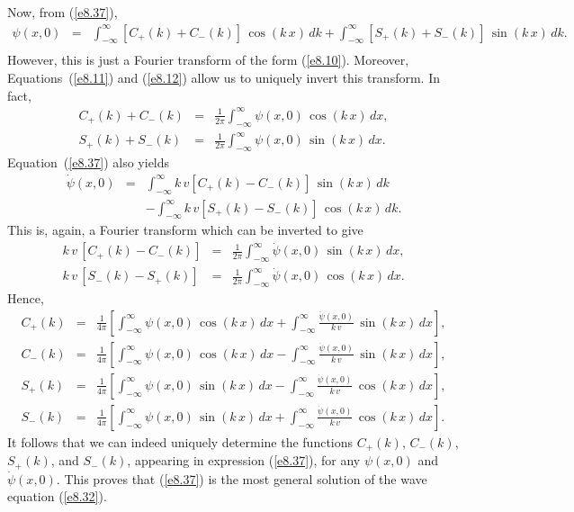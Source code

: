 Now, from (\ref{e8.37}),
\begin{eqnarray}
\psi(x,0) &=& \int_{-\infty}^{\infty}\left[C_+(k)+C_-(k)\right]\,\cos(k\,x)\,dk+  \int_{-\infty}^{\infty}\left[S_+(k)+S_-(k)\right]\,\sin(k\,x)\,dk.\nonumber\\[0.5ex]&&
\end{eqnarray}
However, this is just a Fourier transform of the form (\ref{e8.10}). Moreover,
Equations~(\ref{e8.11}) and (\ref{e8.12}) allow us to uniquely invert this
transform. In fact,
\begin{eqnarray}
C_+(k) + C_-(k) &=& \frac{1}{2\pi}\int_{-\infty}^{\infty} \psi(x,0)\,\cos(k\,x)\,dx,\\[0.5ex]
S_+(k) + S_-(k) &=&  \frac{1}{2\pi}\int_{-\infty}^{\infty} \psi(x,0)\,\sin(k\,x)\,dx.
\end{eqnarray}
Equation~(\ref{e8.37}) also yields
\begin{eqnarray}
\dot{\psi}(x,0) &=& \int_{-\infty}^{\infty}k\,v\left[C_+(k)-C_-(k)\right]\,\sin(k\,x)\,dk\nonumber\\[0.5ex]
&&- \int_{-\infty}^{\infty}k\,v\left[S_+(k)-S_-(k)\right]\,\cos(k\,x)\,dk.
\end{eqnarray}
This is, again, a Fourier transform which can be inverted to give
\begin{eqnarray}
k\,v\,[C_+(k) - C_-(k)]&=& \frac{1}{2\pi}\int_{-\infty}^{\infty} \dot{\psi}(x,0)\,\sin(k\,x)\,dx,\\[0.5ex]
k\,v\,[S_-(k) - S_+(k)] &=&  \frac{1}{2\pi}\int_{-\infty}^{\infty} \dot{\psi}(x,0)\,\cos(k\,x)\,dx.
\end{eqnarray}
Hence,
\begin{eqnarray}
C_+(k)&=&\frac{1}{4\pi}\left[\int_{-\infty}^{\infty}\psi(x,0)\,\cos(k\,x)\,dx
+ \int_{-\infty}^\infty \frac{\dot{\psi}(x,0)}{k\,v}\,\sin(k\,x)\,dx\right],\\[0.5ex]
C_-(k)&=&\frac{1}{4\pi}\left[\int_{-\infty}^{\infty}\psi(x,0)\,\cos(k\,x)\,dx
- \int_{-\infty}^\infty \frac{\dot{\psi}(x,0)}{k\,v}\,\sin(k\,x)\,dx\right],\\[0.5ex]
S_+(k)&=&\frac{1}{4\pi}\left[\int_{-\infty}^{\infty}\psi(x,0)\,\sin(k\,x)\,dx
- \int_{-\infty}^\infty \frac{\dot{\psi}(x,0)}{k\,v}\,\cos(k\,x)\,dx\right],\\[0.5ex]
S_-(k)&=&\frac{1}{4\pi}\left[\int_{-\infty}^{\infty}\psi(x,0)\,\sin(k\,x)\,dx
+\int_{-\infty}^\infty \frac{\dot{\psi}(x,0)}{k\,v}\,\cos(k\,x)\,dx\right].
\end{eqnarray}
It follows that we can indeed uniquely determine the functions $C_+(k)$, $C_-(k)$,
$S_+(k)$, and $S_-(k)$, appearing in expression (\ref{e8.37}), for any $\psi(x,0)$ and $\dot{\psi}(x,0)$. This proves that (\ref{e8.37}) is the most general
solution of the wave equation (\ref{e8.32}).

